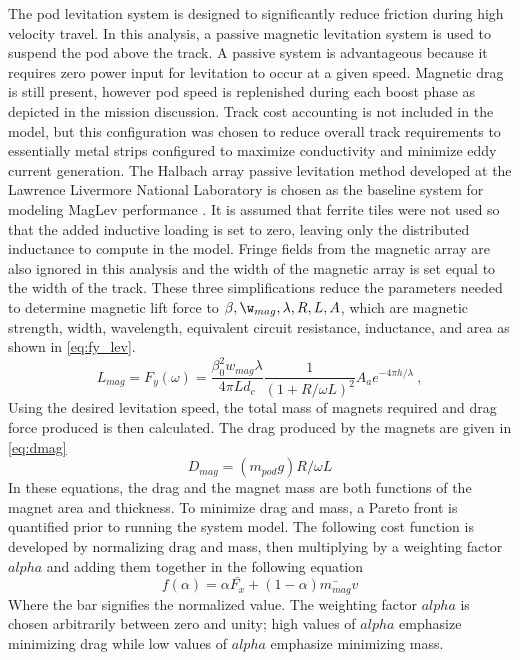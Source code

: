 	The pod levitation system is designed to significantly
	reduce friction during high velocity travel. In this analysis, a
	passive magnetic levitation system is used to suspend the pod above the
	track. A passive system is advantageous because it requires
	zero power input for levitation to occur at a given speed.
  Magnetic drag is still present, however pod speed is replenished during each
  boost phase as depicted in the mission discussion.
  Track cost accounting is not included in the model, but this configuration
  was chosen to reduce overall track requirements to essentially metal strips
  configured to maximize conductivity and minimize eddy current generation.
  The Halbach array passive levitation method
	developed at the Lawrence Livermore National Laboratory is chosen as the
	baseline system for modeling MagLev performance \cite{inductrack}. It is assumed that
	ferrite tiles were not used so that the added inductive loading is set to
	zero, leaving only the distributed inductance to compute in the model.
	Fringe fields from the magnetic array are also ignored in this analysis and
	the width of the magnetic array is set equal to the width of the track.
	These three simplifications reduce the parameters needed to determine
  magnetic lift force to $\beta, \w_{mag}, \lambda, R, L, A$, which are
  magnetic strength, width, wavelength, equivalent circuit resistance, inductance, and area
  as shown in \cref{eq:fy_lev}.
  \begin{equation}
    \label{eq:fy_lev}
    L_{mag} = F_{y}(\omega)=\frac{\beta _{0}^{2}w_{mag}\lambda}{4\pi Ld_{c}}\frac{1}{(1+R/\omega L)^{2}}A_ae^{-4\pi h/\lambda } \ ,
  \end{equation}
	Using the desired levitation speed, the total mass of magnets required and
	drag force produced is then calculated. The drag produced
	by the magnets are given in \cref{eq:dmag}
	\begin{equation}
		\label{eq:dmag}
		D_{mag}=( m_{pod}g)R/\omega L
	\end{equation}
	In these equations, the drag and the magnet mass are both functions of the
	magnet area and thickness. To minimize drag and mass, a Pareto front is
	quantified prior to running the system model. The following cost function
	is developed by normalizing drag and mass, then multiplying by a weighting
	factor $alpha$ and adding them together in the following equation
	\begin{equation}
		\label{eq:pareto}
		f(\alpha ) = \alpha \bar{F_{x}} + (1-\alpha )\bar{m_{mag}}v
	\end{equation}
	Where the bar signifies the normalized value. The weighting factor $alpha$
	is chosen arbitrarily between zero and unity; high values of $alpha$
	emphasize minimizing drag while low values of $alpha$ emphasize minimizing mass.




